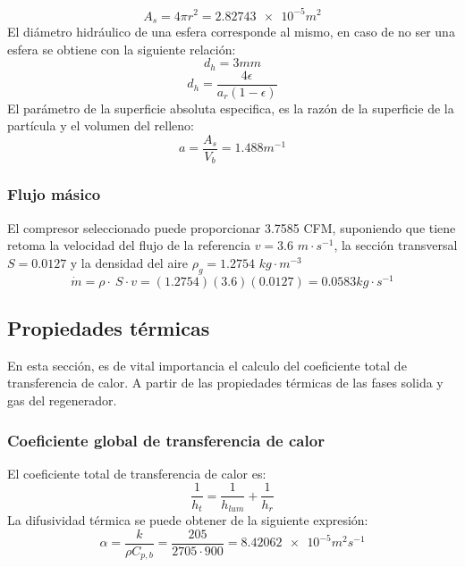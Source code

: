 \documentclass[12pt,letterpaper,final]{article}%
\begin{document}
\begin{equation*}
	A_s = 4 \pi r^2 = \num{2.82743e-5} m^2
\end{equation*}
El diámetro hidráulico de una esfera corresponde al mismo, en caso de no ser una esfera se obtiene con la siguiente relación:
\begin{equation*}
	d_h= 3mm
\end{equation*}
\begin{equation*}
	d_h= \frac{4\epsilon}{a_r(1-\epsilon)}
\end{equation*}
El parámetro de la superficie absoluta especifica, es la razón de la superficie de la partícula y el volumen del relleno:
\begin{equation*}
	a = \frac{A_s}{V_b} = 1.488 m^{-1}
\end{equation*}
\subsubsection*{Flujo másico}
El compresor seleccionado puede proporcionar 3.7585 CFM, suponiendo que tiene retoma la velocidad del flujo de la referencia\cite{Kilkovsky2020} $v=3.6 $ $m\cdot s^{-1}$, la sección transversal $S=0.0127$ y la densidad del aire $\rho_g =1.2754 $ $kg \cdot m^{-3}$
\begin{equation*}
	\dot m = \rho \cdot \ S \cdot v = (1.2754)(3.6)(0.0127) =  0.0583 kg \cdot s^{-1}
\end{equation*}
\subsection{Propiedades térmicas}
En esta sección, es de vital importancia el calculo del coeficiente total de transferencia de calor. A partir de las propiedades térmicas de las fases solida y gas del regenerador.
\newline
\subsubsection{Coeficiente global de transferencia de calor}
El coeficiente total de transferencia de calor es:
\begin{equation*}
	\frac{1}{h_t} = \frac{1}{h_{lum}} + \frac{1}{h_r} 
\end{equation*}
La difusividad térmica se puede obtener de la siguiente expresión:
\begin{equation*}
	\alpha = \frac{k}{\rho C_{p,b}} = \frac{205}{2705 \cdot 900 } = \num{8.42062e-5} m^2 s^{-1} 
\end{equation*}
\end{document}
